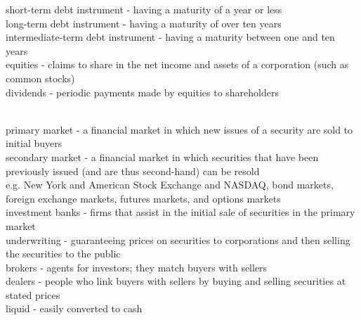 \documentclass[12pt]{article}
\begin{document}
\noindent short-term debt instrument - having a maturity of a year or less\\

\noindent long-term debt instrument - having a maturity of over ten years\\

\noindent intermediate-term debt instrument - having a maturity between one and ten years\\

\noindent equities - claims to share in the net income and assets of a corporation (such as common stocks)\\

\noindent dividends - periodic payments made by equities to shareholders\\

\newpage

\\

\noindent primary market - a financial market in which new issues of a security are sold to initial buyers\\

\noindent secondary market - a financial market in which securities that have been previously issued (and are thus second-hand) can be resold\\
e.g. New York and American Stock Exchange and NASDAQ, bond markets, foreign exchange markets, futures markets, and options markets\\

\noindent investment banks - firms that assist in the initial sale of securities in the primary market\\

\noindent underwriting - guaranteeing prices on securities to corporations and then selling the securities to the public\\

\noindent brokers - agents for investors; they match buyers with sellers\\

\noindent dealers - people who link buyers with sellers by buying and selling securities at stated prices\\

\noindent liquid - easily converted to cash\\

\\
\end{document}
